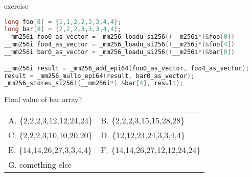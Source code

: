 \begin{frame}[fragile,label=vectExercise]{exercise}
\begin{lstlisting}[language=C++,style=smaller]
long foo[8] = {1,1,2,2,3,3,4,4};
long bar[8] = {2,2,2,3,3,3,4,4};
__mm256i foo0_as_vector = _mm256_loadu_si256((__m256i*)&foo[0])
__mm256i foo4_as_vector = _mm256_loadu_si256((__m256i*)&foo[4])
__mm256i bar0_as_vector = _mm256_loadu_si256((__m256i*)&bar[0])

__mm256i result = _mm256_add_epi64(foo0_as_vector, foo4_as_vector);
result = _mm256_mullo_epi64(result, bar0_as_vector);
_mm256_storeu_si256((__mm256i*) &bar[4], result);
\end{lstlisting}
Final value of bar array?
\small\tt
\begin{tabular}{ll}
A. \{2,2,2,3,12,12,24,24\} & B. \{2,2,2,3,15,15,28,28\} \\
C. \{2,2,2,3,10,10,20,20\} & D. \{12,12,24,24,3,3,4,4\} \\
E. \{14,14,26,27,3,3,4,4\} & F. \{14,14,26,27,12,12,24,24\} \\
G. something else \\
\end{tabular}
\end{frame}

